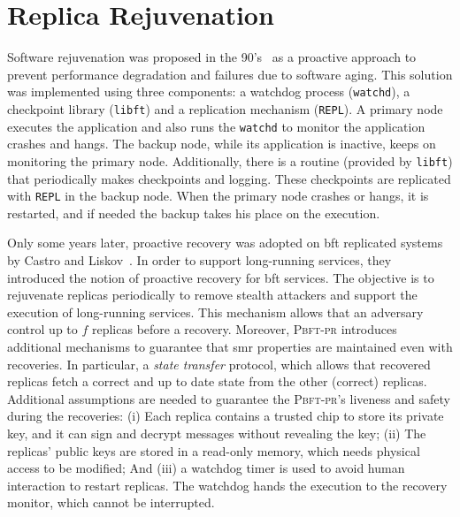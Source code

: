 

\section{Replica Rejuvenation}
Software rejuvenation was proposed in the 90's~\cite{Huang:1993,Huang:1995} as a proactive approach to prevent performance degradation and failures due to software aging. 
This solution was implemented using three components: a watchdog process (\texttt{watchd}), a checkpoint library (\texttt{libft}) and a replication mechanism (\texttt{REPL}). 
A primary node executes the application and also runs the \texttt{watchd} to monitor the application crashes and hangs. 
The backup node, while its application is inactive, keeps on monitoring the primary node. 
Additionally, there is a routine (provided by \texttt{libft}) that periodically makes checkpoints and logging. 
These checkpoints are replicated with \texttt{REPL} in the backup node. 
When the primary node crashes or hangs, it is restarted, and if needed the backup takes his place on the execution.



Only some years later, proactive recovery was adopted on \gls{bft} replicated systems by Castro and Liskov~\cite{Castro:2002}.
In order to support long-running services, they introduced the notion of proactive recovery for \gls{bft} services. 
The objective is to rejuvenate replicas periodically to remove stealth attackers and support the execution of long-running services. 
This mechanism allows that an adversary control up to $f$ replicas before a recovery.
Moreover, \textsc{Pbft-pr} introduces additional mechanisms to guarantee that \gls{smr} properties are maintained even with recoveries.
In particular, a \emph{state transfer} protocol, which allows that recovered replicas fetch a correct and up to date state from the other (correct) replicas.
Additional assumptions are needed to guarantee the \textsc{Pbft-pr}'s liveness and safety during the recoveries: 
(i) Each replica contains a trusted chip to store its private key, and it can sign and decrypt messages without revealing the key; 
(ii) The replicas' public keys are stored in a read-only memory, which needs physical access to be modified; 
And (iii) a watchdog timer is used to avoid human interaction to restart replicas. 
The watchdog hands the execution to the recovery monitor, which cannot be interrupted.


